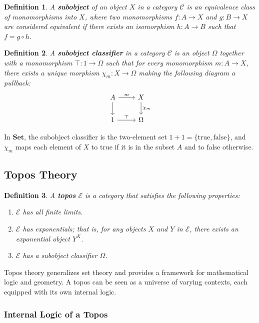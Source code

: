 \documentclass{article}
\newtheorem{definition}{Definition}[section]
\begin{document}
\begin{definition}
A \textbf{subobject} of an object $X$ in a category $\mathcal{C}$ is an equivalence class of monomorphisms into $X$, where two monomorphisms $f \colon A \to X$ and $g \colon B \to X$ are considered equivalent if there exists an isomorphism $h \colon A \to B$ such that $f = g \circ h$.
\end{definition}

\begin{definition}
A \textbf{subobject classifier} in a category $\mathcal{C}$ is an object $\Omega$ together with a monomorphism $\top \colon 1 \to \Omega$ such that for every monomorphism $m \colon A \to X$, there exists a unique morphism $\chi_m \colon X \to \Omega$ making the following diagram a pullback:
\[
\begin{tikzcd}
A \arrow[r, "m"] \arrow[d] & X \arrow[d, "\chi_m"] \\
1 \arrow[r, "\top"] & \Omega
\end{tikzcd}
\]
\end{definition}

In $\mathbf{Set}$, the subobject classifier is the two-element set $1 + 1 = \{\text{true}, \text{false}\}$, and $\chi_m$ maps each element of $X$ to $\text{true}$ if it is in the subset $A$ and to $\text{false}$ otherwise.

\subsection{Topos Theory}

\begin{definition}
A \textbf{topos} $\mathcal{E}$ is a category that satisfies the following properties:
\begin{enumerate}
    \item $\mathcal{E}$ has all finite limits.
    \item $\mathcal{E}$ has exponentials; that is, for any objects $X$ and $Y$ in $\mathcal{E}$, there exists an exponential object $Y^X$.
    \item $\mathcal{E}$ has a subobject classifier $\Omega$.
\end{enumerate}
\end{definition}

Topos theory generalizes set theory and provides a framework for mathematical logic and geometry. A topos can be seen as a universe of varying contexts, each equipped with its own internal logic.

\subsubsection{Internal Logic of a Topos}
\end{document}
